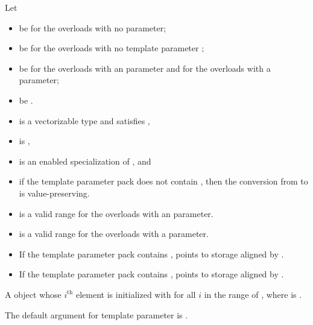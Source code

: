 \begin{itemdescr}
\pnum
Let
\begin{itemize}
 \item
    be  for the overloads with no
    parameter;
 \item
    be  for the overloads with no
   template parameter ;
 \item
    be  for the overloads with an 
   parameter and  for the overloads with a 
   parameter;
 \item
   be .
\end{itemize}

\pnum
\mandates
\begin{itemize}
 \item
    is a vectorizable type and
   satisfies ,
 \item
    is ,
 \item
    is an enabled specialization of , and
 \item
   if the template parameter pack  does not contain
   , then the conversion from
    to  is
   value-preserving.
\end{itemize}

\pnum
\expects
\begin{itemize}
 \item
    is a valid range for the overloads with an
    parameter.
 \item
    is a valid range for the overloads with a 
   parameter.
 \item
   If the template parameter pack  contains
   ,  points to storage
   aligned by .
 \item
   If the template parameter pack  contains
   ,  points to
   storage aligned by .
\end{itemize}

\pnum
\returns
A  object whose $i^\text{th}$ element is initialized with
 for all $i$ in the range of
,
where  is .

\pnum
\remarks
The default argument for template parameter  is
.
\end{itemdescr}


